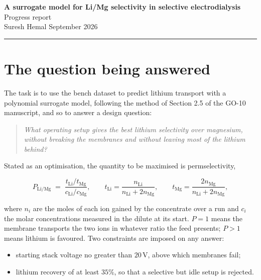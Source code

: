 \documentclass[11pt,a4paper]{article}
\newcommand{\unit}[1]{\,\mathrm{#1}}
\begin{document}
\begin{center}
  {\large\bfseries A surrogate model for Li/Mg selectivity in selective electrodialysis}\\[0.35em]
  {\normalsize Progress report}\\[0.9em]
  {\small Suresh Hemal \quad\textbullet{} September 2026}
\end{center}
\vspace{0.4em}
\hrule
\vspace{1.2em}

\section{The question being answered}

The task is to use the bench dataset to predict lithium transport with a polynomial surrogate
model, following the method of Section 2.5 of the GO-10 manuscript, and so to answer a design
question:

\begin{quote}
\emph{What operating setup gives the best lithium selectivity over magnesium, without
breaking the membranes and without leaving most of the lithium behind?}
\end{quote}

Stated as an optimisation, the quantity to be maximised is permselectivity,

\begin{equation}
P_{\mathrm{Li/Mg}} \;=\; \frac{t_{\mathrm{Li}}/t_{\mathrm{Mg}}}{c_{\mathrm{Li}}/c_{\mathrm{Mg}}},
\qquad
t_{\mathrm{Li}} = \frac{n_{\mathrm{Li}}}{n_{\mathrm{Li}} + 2n_{\mathrm{Mg}}},
\qquad
t_{\mathrm{Mg}} = \frac{2n_{\mathrm{Mg}}}{n_{\mathrm{Li}} + 2n_{\mathrm{Mg}}},
\end{equation}

where $n_i$ are the moles of each ion gained by the concentrate over a run and $c_i$ the molar
concentrations measured in the dilute at its start. $P = 1$ means the membrane transports the
two ions in whatever ratio the feed presents; $P > 1$ means lithium is favoured. Two
constraints are imposed on any answer:

\begin{itemize}[nosep]
  \item starting stack voltage no greater than $20\unit{V}$, above which membranes fail;
  \item lithium recovery of at least $35\%$, so that a selective but idle setup is rejected.
\end{itemize}
\end{document}
